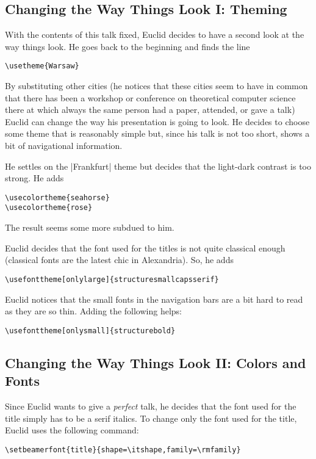 \subsection{Changing the Way Things Look I: Theming}

With the contents of this talk fixed, Euclid decides to have a second look at the way things look. He goes back to the beginning and finds the line
\begin{verbatim}
\usetheme{Warsaw}
\end{verbatim}

By substituting other cities (he notices that these cities seem to have in common that there has been a workshop or conference on theoretical computer science there at which always the same person had a paper, attended, or gave a talk) Euclid can change the way his presentation is going to look. He decides to choose some theme that is reasonably simple but, since his talk is not too short, shows a bit of navigational information.

He settles on the |Frankfurt| theme but decides that the light-dark contrast is too strong. He adds
\begin{verbatim}
\usecolortheme{seahorse}
\usecolortheme{rose}
\end{verbatim}
The result seems some more subdued to him.

Euclid decides that the font used for the titles is not quite classical enough (classical fonts are the latest chic in Alexandria). So, he adds
\begin{verbatim}
\usefonttheme[onlylarge]{structuresmallcapsserif}
\end{verbatim}
Euclid notices that the small fonts in the navigation bars are a bit hard to read as they are so thin. Adding the following helps:
\begin{verbatim}
\usefonttheme[onlysmall]{structurebold}
\end{verbatim}


\subsection{Changing the Way Things Look II: Colors and Fonts}

Since Euclid wants to give a \emph{perfect} talk, he decides that the font used for the title simply has to be a serif italics. To change only the font used for the title, Euclid uses the following command:
\begin{verbatim}
\setbeamerfont{title}{shape=\itshape,family=\rmfamily}
\end{verbatim}

